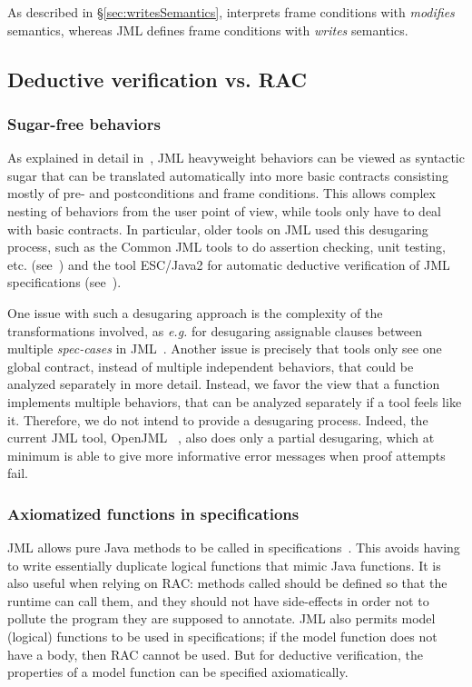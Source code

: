 As described in \S\ref{sec:writesSemantics}, \acsl interprets frame conditions with \emph{modifies} semantics, whereas JML defines frame conditions with \emph{writes} semantics.

\subsection{Deductive verification vs. RAC}

\subsubsection*{Sugar-free behaviors}

As explained in detail in~\cite{raghavan00desugaring}, JML
heavyweight behaviors can be viewed as syntactic sugar that can be translated automatically into more basic
contracts consisting mostly of pre- and postconditions and frame
conditions.  This allows complex nesting of behaviors from the user
point of view, while tools only have to deal with basic contracts. In
particular, older tools on JML used this desugaring process, such as
the Common JML tools to do assertion checking, unit testing,
etc. (see~\cite{leavens00jml}) and the tool ESC/Java2 for
automatic deductive verification of JML specifications
(see~\cite{Kiniry-Cok05}).

One issue with such a desugaring approach is the complexity of the
transformations involved, as \emph{e.g.} for desugaring assignable clauses
between multiple \textit{spec-cases} in
JML~\cite{raghavan00desugaring}.  Another issue is precisely that
tools only see one global contract, instead of multiple independent
behaviors, that could be analyzed separately in more detail.
Instead, we favor the view that a function implements multiple
behaviors, that can be analyzed separately if a tool feels like
it. Therefore, we do not intend to provide a desugaring process.
Indeed, the current JML tool, OpenJML ~\cite{Cok-2011-OpenJML,Cok-2014-OpenJML}, also does only a partial desugaring, which at minimum is able to give more informative error messages when proof attempts fail.

\subsubsection*{Axiomatized functions in specifications}

JML allows pure Java methods to be called in
specifications~\cite{leavens00preliminary}. This avoids having
to write essentially duplicate logical functions that mimic Java functions. It is also useful when relying on RAC: methods called should be defined
so that the runtime can call them, and they should not have
side-effects in order not to pollute the program they are supposed to
annotate. 
JML also permits model (logical) functions to be
used in specifications; if the model function does not have
a body, then RAC cannot be used. But for deductive verification, 
the properties of a model function can be specified axiomatically.

